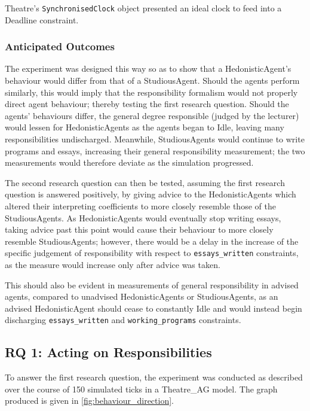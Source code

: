 Theatre's \texttt{SynchronisedClock} object presented an ideal clock to feed into a Deadline constraint.

\subsubsection{Anticipated Outcomes}

The experiment was designed this way so as to show that a HedonisticAgent's behaviour would differ from that of a StudiousAgent. Should the agents perform similarly, this would imply that the responsibility formalism would not properly direct agent behaviour; thereby testing the first research question. Should the agents' behaviours differ, the general degree responsible (judged by the lecturer) would lessen for HedonisticAgents as the agents began to Idle, leaving many responsibilities undischarged. Meanwhile, StudiousAgents would continue to write programs and essays, increasing their general responsibility measurement; the two measurements would therefore deviate as the simulation progressed.\par

The second research question can then be tested, assuming the first research question is answered positively, by giving advice to the HedonisticAgents which altered their interpreting coefficients to more closely resemble those of the StudiousAgents. As HedonisticAgents would eventually stop writing essays, taking advice past this point would cause their behaviour to more closely resemble StudiousAgents; however, there would be a delay in the increase of the specific judgement of responsibility with respect to \texttt{essays\_written} constraints, as the measure would increase only after advice was taken.\par

This should also be evident in measurements of general responsibility in advised agents, compared to unadvised HedonisticAgents or StudiousAgents, as an advised HedonisticAgent should cease to constantly Idle and would instead begin discharging \texttt{essays\_written} and \texttt{working\_programs} constraints.\par

\subsection{RQ 1: Acting on Responsibilities}
To answer the first research question, the experiment was conducted as described over the course of 150 simulated ticks in a Theatre\_AG model. The graph produced is given in \cref{fig:behaviour_direction}.

